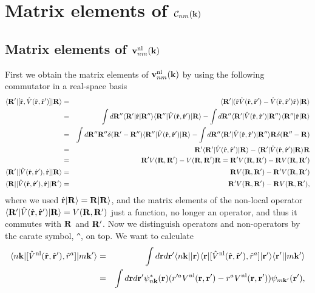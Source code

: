 \documentclass[floatfix,prb,aps,superscriptaddress,11pt,preprint]{revtex4}
\begin{document}
\section{Matrix elements of $\calc_{nm}(\bfk)$}\label{calc}

\subsection{Matrix elements of $\bfv^\nl_{nm}(\bfk)$}

First we obtain the matrix elements of $\bfv^\nl_{nm}(\bfk)$ by using
the following commutator in a
real-space basis
\begin{eqnarray}\label{cn0}
\bra{\bfR'}[\hat\bfr,\hat V(\hat\bfr,\hat\bfr')]\ket{\bfR}
&=&
\bra{\bfR'}(\hat\bfr\hat V(\hat\bfr,\hat\bfr')
-
\hat V(\hat\bfr,\hat\bfr')\hat\bfr
)
\ket{\bfR}
\nonumber\\
&=&
\int d\bfR''\bra{\bfR'}\hat\bfr\ket{\bfR''}\bra{\bfR''}\hat V(\hat\bfr,\hat\bfr') \ket{\bfR}
-
\int d\bfR''\bra{\bfR'}\hat V(\hat\bfr,\hat\bfr')\ket{\bfR''}\bra{\bfR''}\hat\bfr\ket{\bfR}
\nonumber\\
&=&
\int d\bfR'' \bfR''\gd(\bfR'-\bfR'')
\bra{\bfR''}\hat V(\hat\bfr,\hat\bfr') \ket{\bfR}
-
\int d\bfR''\bra{\bfR'}\hat V(\hat\bfr,\hat\bfr')\ket{\bfR''}\bfR\gd(\bfR''-\bfR)
\nonumber\\
&=&
\bfR'\bra{\bfR'}\hat V(\hat\bfr,\hat\bfr') \ket{\bfR}
-
\bra{\bfR'}\hat V(\hat\bfr,\hat\bfr')\ket{\bfR}\bfR
\nonumber\\
&=&
\bfR'
V(\bfR,\bfR')
-
V(\bfR,\bfR')
\bfR
=
\bfR'
V(\bfR,\bfR')
-
\bfR
 V(\bfR,\bfR')
\nonumber\\
\bra{\bfR'}[\hat V(\hat\bfr,\hat\bfr'),\hat\bfr]\ket{\bfR}
&=&
\bfR
V(\bfR,\bfR')
-
\bfR'
 V(\bfR,\bfR')
\nonumber\\
\bra{\bfR}[\hat V(\hat\bfr,\hat\bfr'),\hat\bfr]\ket{\bfR'}
&=&
\bfR'
V(\bfR,\bfR')
-
\bfR
 V(\bfR,\bfR')
,
\end{eqnarray} 
where we used $\hat\bfr\ket{\bfR}=\bfR\ket{\bfR}$, and
the matrix elements of the non-local operator
$\bra{\bfR'}\hat V(\hat\bfr,\hat\bfr')\ket{\bfR}=V(\bfR,\bfR')$ just a
function, no longer an operator, and thus it commutes with $\bfR$ and $\bfR'$.
Now we distinguish operators and non-operators by the carate symbol,
\verb=^=, on top.
We want to calculate
\begin{eqnarray}\label{cn2}
\bra{n\bfk}[\hat V^\nl(\hat\bfr,\hat\bfr'),\hat r^a]\ket{m\bfk'}
&=&
\int d\bfr d\bfr'
\bra{n\bfk}
\ket{\bfr}\bra{\bfr}
[\hat V^\nl(\hat\bfr,\hat\bfr'),\hat r^a]
\ket{\bfr'}\bra{\bfr'}
\ket{m\bfk'}
\nonumber\\
&=&
\int d\bfr d\bfr'
\psi^*_{n\bfk}(\bfr)
(  
r'^a V^\nl(\bfr,\bfr')
-  
r^aV^\nl(\bfr,\bfr')
)
\psi_{m\bfk'}(\bfr')
,
\end{eqnarray}  
\end{document}
